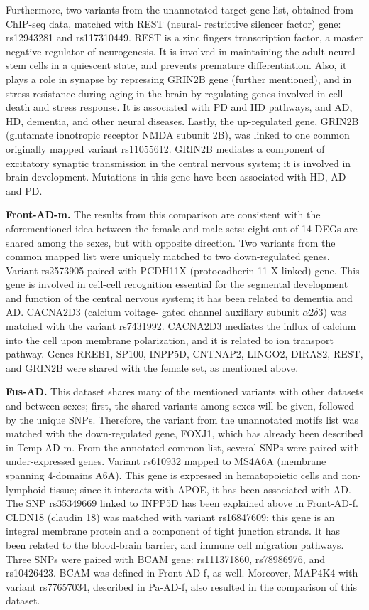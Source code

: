 Furthermore, two variants from the unannotated target gene list, obtained from ChIP-seq data, matched with REST (neural- restrictive silencer factor) gene: rs12943281 and rs117310449. REST is a zinc fingers transcription factor, a master negative regulator of neurogenesis. It is involved in maintaining the adult neural stem cells in a quiescent state, and prevents premature differentiation. Also, it plays a role in synapse by repressing GRIN2B gene (further mentioned), and in stress resistance during aging in the brain by regulating genes involved in cell death and stress response. It is associated with PD and HD pathways, and AD, HD, dementia, and other neural diseases. Lastly, the up-regulated gene, GRIN2B (glutamate ionotropic receptor NMDA subunit 2B), was linked to one common originally mapped variant rs11055612. GRIN2B mediates a component of excitatory synaptic transmission in the central nervous system; it is involved in brain development. Mutations in this gene have been associated with HD, AD and PD.

\textbf{Front-AD-m.} The results from this comparison are consistent with the aforementioned idea between the female and male sets: eight out of 14 DEGs are shared among the sexes, but with opposite direction. Two variants from the common mapped list were uniquely matched to two down-regulated genes. Variant rs2573905 paired with PCDH11X (protocadherin 11 X-linked) gene. This gene is involved in cell-cell recognition essential for the segmental development and function of the central nervous system; it has been related to dementia and AD. CACNA2D3 (calcium voltage- gated channel auxiliary subunit $\alpha2\delta3$) was matched with the variant rs7431992. CACNA2D3 mediates the influx of calcium into the cell upon membrane polarization, and it is related to ion transport pathway. Genes RREB1, SP100, INPP5D, CNTNAP2, LINGO2, DIRAS2, REST, and GRIN2B were shared with the female set, as mentioned above.

\textbf{Fus-AD.} This dataset shares many of the mentioned variants with other datasets and between sexes; first, the shared variants among sexes will be given, followed by the unique SNPs. Therefore, the variant from the unannotated motifs list was matched with the down-regulated gene, FOXJ1, which has already been described in Temp-AD-m. From the annotated common list, several SNPs were paired with under-expressed genes. Variant rs610932 mapped to MS4A6A (membrane spanning 4-domains A6A). This gene is expressed in hematopoietic cells and non-lymphoid tissue; since it interacts with APOE, it has been associated with AD. The SNP rs35349669 linked to INPP5D has been explained above in Front-AD-f. CLDN18 (claudin 18) was matched with variant rs16847609; this gene is an integral membrane protein and a component of tight junction strands. It has been related to the blood-brain barrier, and immune cell migration pathways. Three SNPs were paired with BCAM gene: rs111371860, rs78986976, and rs10426423. BCAM was defined in Front-AD-f, as well. Moreover, MAP4K4 with variant rs77657034, described in Pa-AD-f, also resulted in the comparison of this dataset.

